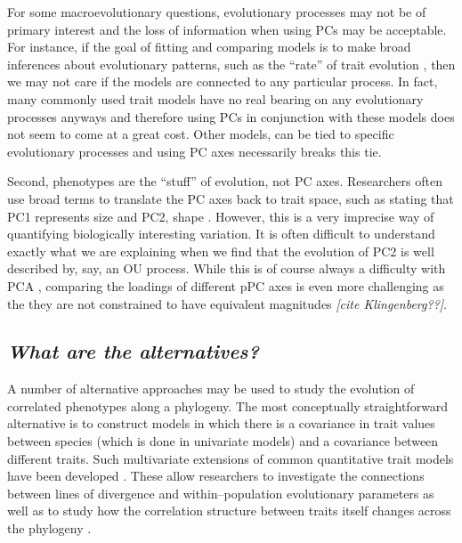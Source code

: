 \documentclass[a4paper,12pt]{article}
\begin{document}
For some macroevolutionary questions, evolutionary processes may not be of primary interest and the loss of information when using PCs may be acceptable. For instance, if the goal of fitting and comparing models is to make broad inferences about evolutionary patterns, such as the ``rate'' of trait evolution \citep{Hunt2012}, then we may not care if the models are connected to any particular process. In fact, many commonly used trait models \citep[such as the $\lambda, \delta, \text{and} \kappa$ tree transformations;][]{Pagel1997, Pagel1999} have no real bearing on any evolutionary processes anyways \citep{HansenOrzack2005} and therefore using PCs in conjunction with these models does not seem to come at a great cost. Other models, can be tied to specific evolutionary processes \citep{HansenMartins1996, EstesArnold2007, Hansen2008, Hansen2012SysBio, PennellHarmon, PennellPE} and using PC axes necessarily breaks this tie.

Second, phenotypes are the ``stuff'' of evolution, not PC axes. Researchers often use broad terms to translate the PC axes back to trait space, such as stating that PC1 represents size and PC2, shape \citep[e.g.,][]{Harmon2010, Price2014}. However, this is a very imprecise way of quantifying biologically interesting variation. It is often difficult to understand exactly what we are explaining when we find that the evolution of PC2 is well described by, say, an OU process. While this is of course always a difficulty with PCA \citep{Jolliffe2002}, comparing the loadings of different pPC axes is even more challenging as the they are not constrained to have equivalent magnitudes \emph{[cite Klingenberg??]}.

\subsection{\emph{What are the alternatives?}}

A number of alternative approaches may be used to study the evolution of correlated phenotypes along a phylogeny. The most conceptually straightforward alternative is to construct models in which there is a covariance in trait values between species (which is done in univariate models) and a covariance between different traits. Such multivariate extensions of common quantitative trait models have been developed \citep{ButlerKing2004, RevellHarmon2008, Hohenlohe2008, RevellCollar2009, motmot}. These allow researchers to investigate the connections between lines of divergence and within--population evolutionary parameters \citep{Hohenlohe2008} as well as to study how the correlation structure between traits itself changes across the phylogeny \citep{RevellCollar2009}. 
\end{document}
